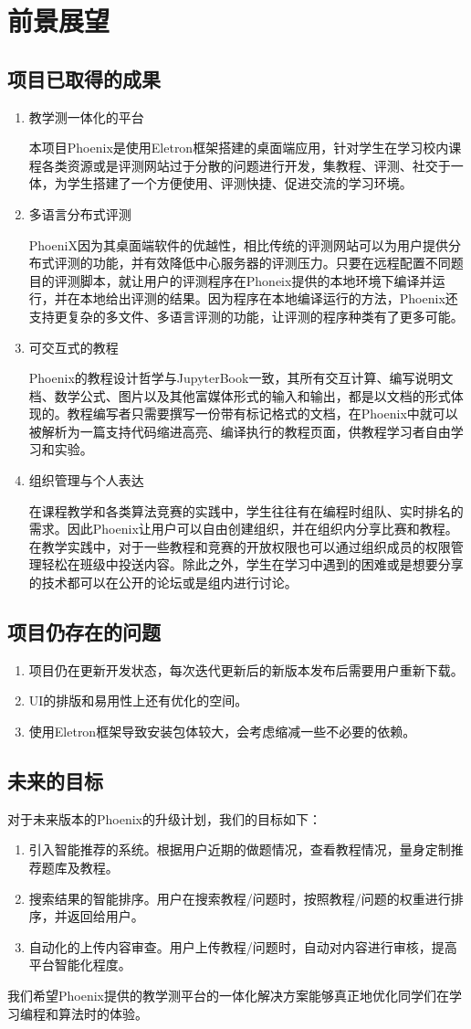 \chapter{前景展望}

\section{项目已取得的成果}
\begin{enumerate}
    

\item{教学测一体化的平台}
\par
本项目Phoenix是使用Eletron框架搭建的桌面端应用，针对学生在学习校内课程各类资源或是评测网站过于分散的问题进行开发，集教程、评测、社交于一体，为学生搭建了一个方便使用、评测快捷、促进交流的学习环境。
\item{多语言分布式评测}
\par
PhoeniX因为其桌面端软件的优越性，相比传统的评测网站可以为用户提供分布式评测的功能，并有效降低中心服务器的评测压力。只要在远程配置不同题目的评测脚本，就让用户的评测程序在Phoneix提供的本地环境下编译并运行，并在本地给出评测的结果。因为程序在本地编译运行的方法，Phoenix还支持更复杂的多文件、多语言评测的功能，让评测的程序种类有了更多可能。

\item{可交互式的教程}
\par
Phoenix的教程设计哲学与JupyterBook一致，其所有交互计算、编写说明文档、数学公式、图片以及其他富媒体形式的输入和输出，都是以文档的形式体现的。教程编写者只需要撰写一份带有标记格式的文档，在Phoenix中就可以被解析为一篇支持代码缩进高亮、编译执行的教程页面，供教程学习者自由学习和实验。
\item{组织管理与个人表达}
\par
在课程教学和各类算法竞赛的实践中，学生往往有在编程时组队、实时排名的需求。因此Phoenix让用户可以自由创建组织，并在组织内分享比赛和教程。在教学实践中，对于一些教程和竞赛的开放权限也可以通过组织成员的权限管理轻松在班级中投送内容。除此之外，学生在学习中遇到的困难或是想要分享的技术都可以在公开的论坛或是组内进行讨论。
\end{enumerate}
\newpage

\section{项目仍存在的问题}
\begin{enumerate}
    \item 项目仍在更新开发状态，每次迭代更新后的新版本发布后需要用户重新下载。
    \item UI的排版和易用性上还有优化的空间。
    \item 使用Eletron框架导致安装包体较大，会考虑缩减一些不必要的依赖。
\end{enumerate}
\section{未来的目标}
对于未来版本的Phoenix的升级计划，我们的目标如下：
\begin{enumerate}
    \item 引入智能推荐的系统。根据用户近期的做题情况，查看教程情况，量身定制推荐题库及教程。
    \item 搜索结果的智能排序。用户在搜索教程/问题时，按照教程/问题的权重进行排序，并返回给用户。
    \item 自动化的上传内容审查。用户上传教程/问题时，自动对内容进行审核，提高平台智能化程度。
\end{enumerate}
我们希望Phoenix提供的教学测平台的一体化解决方案能够真正地优化同学们在学习编程和算法时的体验。
